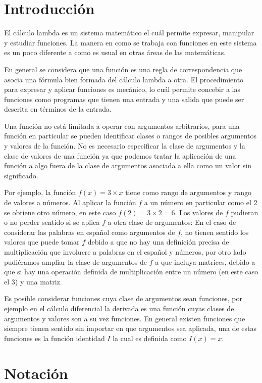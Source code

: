 \section{Introducción}

El cálculo lambda es un sistema matemático el cuál permite expresar, manipular
y estudiar funciones. La manera en como se trabaja con funciones en
este sistema es un poco diferente a como es usual en otras áreas de
las matemáticas.\

En general se considera que una función es una regla de correspondencia
que asocia una fórmula bien formada del cálculo lambda a otra. El procedimiento
para expresar y aplicar funciones es mecánico, lo cuál permite concebir a las
funciones como programas que tienen una entrada y una salida que puede ser
descrita en términos de la entrada.\

Una función no está limitada a operar con argumentos arbitrarios, para
una función en particular se pueden identificar clases o rangos de
posibles argumentos y valores de la función. No es necesario
especificar la clase de argumentos y la clase de valores de una
función ya que podemos tratar la aplicación de una función a algo
fuera de la clase de argumentos asociada a ella como un valor sin
significado.\

Por ejemplo, la función \(f(x) = 3\times x\) tiene como rango de
argumentos y rango de valores a números. Al aplicar la función \(f\) a
un número en particular como el \(2\) se obtiene otro número, en este
caso \(f(2) = 3\times 2 = 6\). Los valores de \(f\) pudieran o no perder
sentido si se aplica \(f\) a otra clase de argumentos: En el caso de
considerar las palabras en español como argumentos de \(f\), no tienen
sentido los valores que puede tomar \(f\) debido a que no hay una
definición precisa de multiplicación que involucre a palabras en el
español y números, por otro lado pudiéramos ampliar la clase de
argumentos de \(f\) a que incluya matrices, debido a que si hay una
operación definida de multiplicación entre un número (en este caso el
3) y una matriz.\

Es posible considerar funciones cuya clase de argumentos sean
funciones, por ejemplo en el cálculo diferencial la derivada es una
función cuyas clases de argumentos y valores son a su vez funciones.
En general existen funciones que siempre tienen sentido sin importar
en que argumentos sea aplicada, una de estas funciones es la función
identidad \(I\) la cual es definida como \(I(x) = x\).

\section{Notación}

